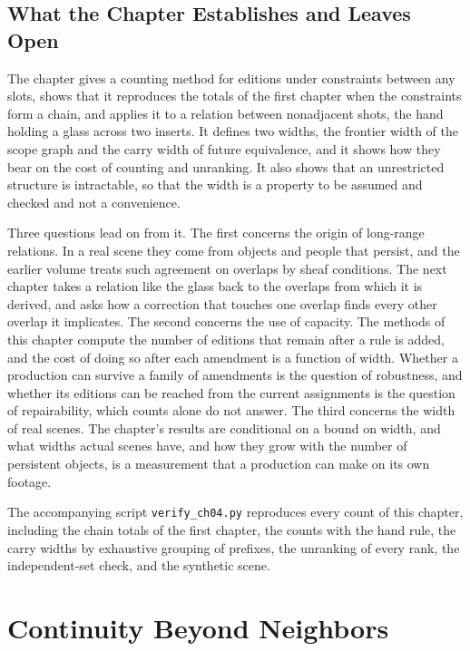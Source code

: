 \documentclass[11pt,twoside,openright]{book}
\theoremstyle{plain}
\theoremstyle{definition}
\theoremstyle{remark}
\begin{document}
\section{What the Chapter Establishes and Leaves Open}\label{sec:chapter-end}

The chapter gives a counting method for editions under constraints between any slots, shows that it reproduces the totals of the first chapter when the constraints form a chain, and applies it to a relation between nonadjacent shots, the hand holding a glass across two inserts. It defines two widths, the frontier width of the scope graph and the carry width of future equivalence, and it shows how they bear on the cost of counting and unranking. It also shows that an unrestricted structure is intractable, so that the width is a property to be assumed and checked and not a convenience.

Three questions lead on from it. The first concerns the origin of long-range relations. In a real scene they come from objects and people that persist, and the earlier volume treats such agreement on overlaps by sheaf conditions. The next chapter takes a relation like the glass back to the overlaps from which it is derived, and asks how a correction that touches one overlap finds every other overlap it implicates. The second concerns the use of capacity. The methods of this chapter compute the number of editions that remain after a rule is added, and the cost of doing so after each amendment is a function of width. Whether a production can survive a family of amendments is the question of robustness, and whether its editions can be reached from the current assignments is the question of repairability, which counts alone do not answer. The third concerns the width of real scenes. The chapter's results are conditional on a bound on width, and what widths actual scenes have, and how they grow with the number of persistent objects, is a measurement that a production can make on its own footage.

The accompanying script \texttt{verify\_ch04.py} reproduces every count of this chapter, including the chain totals of the first chapter, the counts with the hand rule, the carry widths by exhaustive grouping of prefixes, the unranking of every rank, the independent-set check, and the synthetic scene.

\chapter{Continuity Beyond Neighbors}
\label{ch:continuity}
\end{document}
